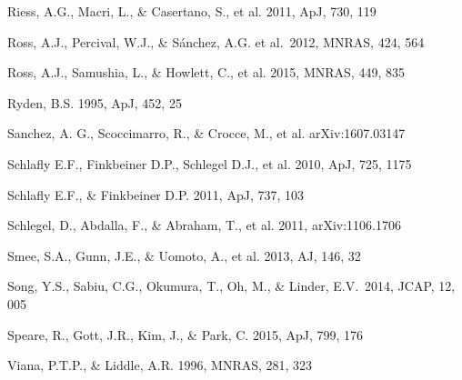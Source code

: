 \documentclass[useAMS,usenatbib]{mnras}
\begin{document}
\begin{thebibliography}{}
Riess, A.G., Macri, L., \& Casertano, S., et al. 2011, ApJ, 730, 119

Ross, A.J., Percival, W.J., \& S{\'a}nchez, A.G. et al.\ 2012, MNRAS, 424, 564 

Ross, A.J., Samushia, L., \& Howlett, C., et al. 2015, MNRAS, 449, 835

Ryden, B.S. 1995, ApJ, 452, 25  





Sanchez, A. G., Scoccimarro, R., \& Crocce, M., et al.
arXiv:1607.03147

Schlafly E.F., Finkbeiner D.P., Schlegel D.J., et al. 2010, ApJ, 725, 1175

Schlafly E.F., \& Finkbeiner D.P. 2011, ApJ, 737, 103


Schlegel, D., Abdalla, F., \& Abraham, T., et al. 2011, arXiv:1106.1706

Smee, S.A., Gunn, J.E., \& Uomoto, A., et al. 2013, AJ, 146, 32

Song, Y.S., Sabiu, C.G., 
Okumura, T., Oh, M., \& Linder, E.V.\ 2014, JCAP, 12, 005 

Speare, R., Gott, J.R., Kim, J., \& Park, C.
2015, ApJ, 799, 176



Viana, P.T.P., \& Liddle, A.R. 1996, MNRAS, 281, 323


\end{thebibliography}
\end{document}
